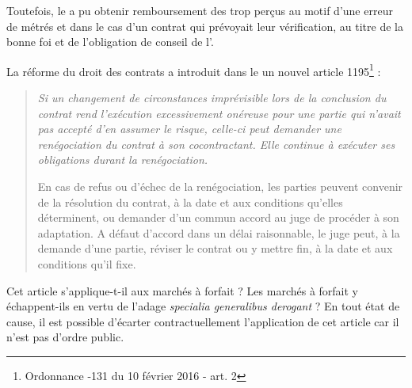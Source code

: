 					Toutefois, le \Mo a pu obtenir remboursement des trop perçus au motif d'une erreur de métrés et dans le cas d'un contrat qui prévoyait leur vérification, au titre de la bonne foi et de l'obligation de conseil de l'\E.
					
					La réforme du droit des contrats a introduit dans le \cciv un nouvel article 1195\footnote{Ordonnance -131 du 10 février 2016 - art. 2} :
					\begin{quote}
						\itshape Si un changement de circonstances imprévisible lors de la conclusion du contrat rend l'exécution excessivement onéreuse pour une partie qui n'avait pas accepté d'en assumer le risque, celle-ci peut demander une renégociation du contrat à son cocontractant. Elle continue à exécuter ses obligations durant la renégociation.
						
						En cas de refus ou d'échec de la renégociation, les parties peuvent convenir de la résolution du contrat, à la date et aux conditions qu'elles déterminent, ou demander d'un commun accord au juge de procéder à son adaptation. A défaut d'accord dans un délai raisonnable, le juge peut, à la demande d'une partie, réviser le contrat ou y mettre fin, à la date et aux conditions qu'il fixe.
					\end{quote}
					Cet article s'applique-t-il aux marchés à forfait ? Les marchés à forfait y échappent-ils en vertu de l'adage \emph{specialia generalibus derogant} ? En tout état de cause, il est possible d'écarter contractuellement l'application de cet article car il n'est pas d'ordre public.
					
